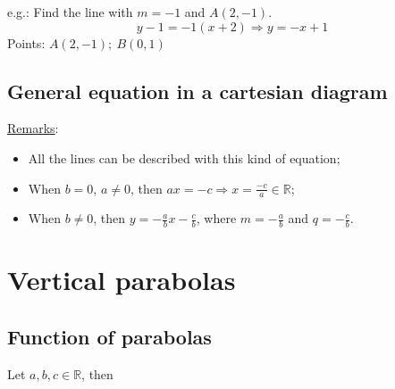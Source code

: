 \documentclass{article}
\newcommand{\figbox}[1]{ 
    \begin{figure*}[ht!]        
        \begin{center}            
            \fbox{#1}        
        \end{center}    
    \end{figure*}
}
\begin{document}
e.g.: Find the line with $m=-1$ and $A(2,-1)$.
\[
    y-1=-1(x+2) \Rightarrow y=-x+1
\]
\hspace{.75cm} Points: $A(2,-1);\ B(0,1)$


\begin{center}
\end{center}

\subsection{General equation in a cartesian diagram}
\figbox{$ax+by+c=0$}

\underline{Remarks}:
\begin{itemize}
    \item All the lines can be described with this kind of equation;
    \item When $b=0$, $a \neq 0$, then $ax=-c \Rightarrow x=\frac{-c}{a} \in \mathbb{R}$;
    \item When $b \neq 0$, then $y=-\frac{a}{b}x -\frac{c}{b}$,
        where $m=-\frac{a}{b}$ and $q=-\frac{c}{b}$.
\end{itemize}

\newpage
\section{Vertical parabolas}
\subsection{Function of parabolas}
Let $a,b,c \in \mathbb{R}$, then
\figbox{$y=a^2+bx+c$}
\end{document}
